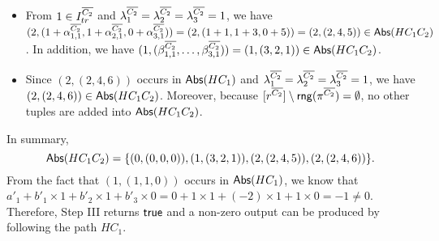 \begin{example}
\begin{itemize}
\item From $1 \in I^{\overline{C_2}}_{tr}$ and $\lambda^{\overline{C_2}}_1 = \lambda^{\overline{C_2}}_2 = \lambda^{\overline{C_2}}_3 = 1$, we have $(2, (1 + \alpha^{\overline{C_2}}_{1, 1}, 1+\alpha^{\overline{C_2}}_{2, 1}, 0 + \alpha^{\overline{C_2}}_{3, 1})) = (2, (1+1, 1+3, 0 +5))= (2, (2, 4, 5)) \in \mathsf{Abs}(HC_1C_2)$. In addition, we have $(1, (\beta^{\overline{C_2}}_{1, 1}, \dots, \beta^{\overline{C_2}}_{3, 1}))=(1, (3, 2, 1)) \in \mathsf{Abs}(HC_1C_2)$.

\item Since $(2, (2, 4, 6))$ occurs in $\mathsf{Abs}(HC_1)$ and $\lambda^{\overline{C_2}}_1 = \lambda^{\overline{C_2}}_2 = \lambda^{\overline{C_2}}_3 = 1$, we have $(2, (2, 4, 6)) \in \mathsf{Abs}(HC_1C_2)$. Moreover, because $[r^{\overline{C_2}}] \setminus \mathsf{rng}(\pi^{\overline{C_2}})=\emptyset$, no other tuples are added into $\mathsf{Abs}(HC_1C_2)$.
\end{itemize}
In summary, 
$$\mathsf{Abs}(HC_1C_2)= \{(0,(0,0,0)), (1, (3,2,1)), (2, (2,4,5)), (2, (2, 4,6))\}.$$
From the fact that $(1, (1, 1, 0))$ occurs in $\mathsf{Abs}(HC_1)$, we know that $a'_1 + b'_1 \times 1 + b'_2 \times 1 + b'_3 \times 0 = 0 + 1 \times 1 + (-2) \times 1 + 1 \times 0 = -1 \neq 0$. Therefore, Step III returns $\mathsf{true}$ and a non-zero output can be produced by following the path $HC_1$.
\end{example}
